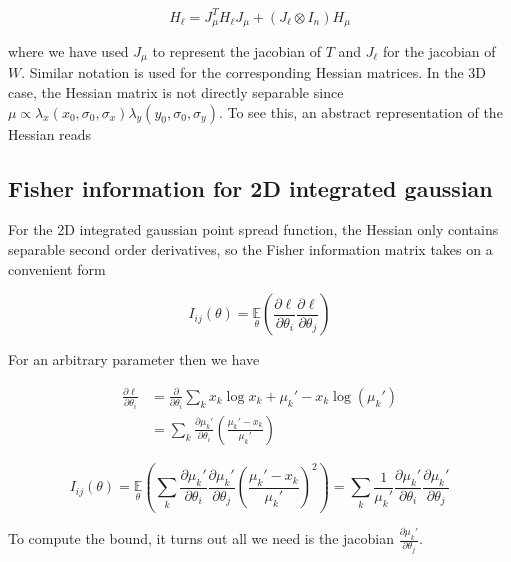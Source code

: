 \begin{equation*}
H_{\ell} = J_{\mu}^{T} H_{\ell} J_{\mu} + (J_{\ell}\otimes I_{n})H_{\mu}
\end{equation*}

where we have used $J_{\mu}$ to represent the jacobian of $T$ and $J_{\ell}$ for the jacobian of $W$. Similar notation is used for the corresponding Hessian matrices. 
In the 3D case, the Hessian matrix is not directly separable since $\mu \propto \lambda_{x}(x_{0},\sigma_{0},\sigma_{x})\lambda_{y}(y_{0},\sigma_{0},\sigma_{y})$. To see this, an abstract representation of the Hessian reads 


\subsection{Fisher information for 2D integrated gaussian}

For the 2D integrated gaussian point spread function, the Hessian only contains separable second order derivatives, so the Fisher information matrix takes on a convenient form

\begin{equation}
I_{ij}(\theta) = \underset{\theta}{\mathbb{E}}\left(\frac{\partial \ell}{\partial\theta_{i}}\frac{\partial\ell}{\partial\theta_{j}}\right) 
\end{equation}

For an arbitrary parameter then we have

\begin{align*}
\frac{\partial \ell}{\partial \theta_{i}} &= \frac{\partial}{\partial \theta_{i}} \sum_{k}  x_{k}\log x_{k} + \mu_{k}' - x_{k}\log\left(\mu_{k}'\right)\\
&= \sum_{k} \frac{\partial \mu_{k}'}{\partial\theta_{i}} \left(\frac{\mu_{k}'-x_{k}}{\mu_{k}'}\right)
\end{align*}

\begin{equation*}
I_{ij}(\theta) = \underset{\theta}{\mathbb{E}}\left(\sum_{k}\frac{\partial \mu_{k}'}{\partial\theta_{i}}\frac{\partial \mu_{k}'}{\partial\theta_{j}} \left(\frac{\mu_{k}'-x_{k}}{\mu_{k}'}\right)^{2}\right) = \sum_{k}\frac{1}{\mu_{k}'}\frac{\partial \mu_{k}'}{\partial\theta_{i}}\frac{\partial \mu_{k}'}{\partial\theta_{j}}
\end{equation*}

To compute the bound, it turns out all we need is the jacobian $\frac{\partial \mu_{k}'}{\partial\theta_{j}} $.


